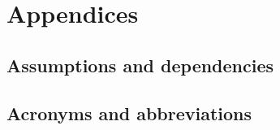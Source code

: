 \section{Appendices}

\subsection{Assumptions and dependencies}

\subsection{Acronyms and abbreviations}
